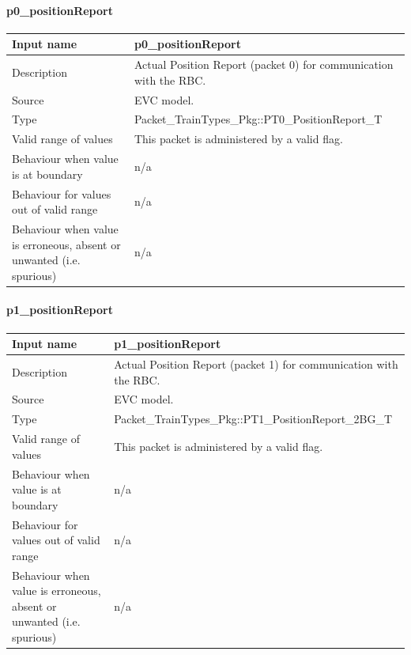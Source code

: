 \paragraph{p0\_positionReport}

\begin{longtable}{p{}p{}}
\toprule
Input name				& p0\_positionReport\\
\midrule
Description				& Actual Position Report (packet 0) for communication with the RBC.
\\
\midrule
Source					& EVC model.\\ 
\midrule
Type					& Packet\_TrainTypes\_Pkg::PT0\_PositionReport\_T\\
\midrule
Valid range of values	& This packet is administered by a valid flag.\\
\midrule
Behaviour when value is at boundary	& n/a\\
\midrule
Behaviour for values out of valid range	& n/a\\
\midrule
Behaviour when value is erroneous, absent or unwanted (i.e. spurious) & n/a\\

\bottomrule
\end{longtable}

\paragraph{p1\_positionReport}

\begin{longtable}{p{}p{}}
\toprule
Input name				& p1\_positionReport\\
\midrule
Description				& Actual Position Report (packet 1) for communication with the RBC.
\\
\midrule
Source					& EVC model.\\ 
\midrule
Type					& Packet\_TrainTypes\_Pkg::PT1\_PositionReport\_2BG\_T\\
\midrule
Valid range of values	& This packet is administered by a valid flag.\\
\midrule
Behaviour when value is at boundary	& n/a\\
\midrule
Behaviour for values out of valid range	& n/a\\
\midrule
Behaviour when value is erroneous, absent or unwanted (i.e. spurious) & n/a\\

\bottomrule
\end{longtable}

